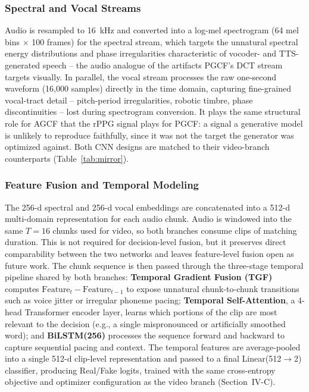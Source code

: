 \documentclass[conference]{IEEEtran}
\begin{document}
\subsubsection{Spectral and Vocal Streams}
Audio is resampled to 16~kHz and converted into a log-mel spectrogram (64 mel bins $\times$ 100 frames) for the spectral stream, which targets the unnatural spectral energy distributions and phase irregularities characteristic of vocoder- and TTS-generated speech -- the audio analogue of the artifacts PGCF's DCT stream targets visually. In parallel, the vocal stream processes the raw one-second waveform (16{,}000 samples) directly in the time domain, capturing fine-grained vocal-tract detail -- pitch-period irregularities, robotic timbre, phase discontinuities -- lost during spectrogram conversion. It plays the same structural role for AGCF that the rPPG signal plays for PGCF: a signal a generative model is unlikely to reproduce faithfully, since it was not the target the generator was optimized against. Both CNN designs are matched to their video-branch counterparts (Table~\ref{tab:mirror}).

\subsubsection{Feature Fusion and Temporal Modeling}
The 256-d spectral and 256-d vocal embeddings are concatenated into a 512-d multi-domain representation for each audio chunk. Audio is windowed into the same $T=16$ chunks used for video, so both branches consume clips of matching duration. This is not required for decision-level fusion, but it preserves direct comparability between the two networks and leaves feature-level fusion open as future work. The chunk sequence is then passed through the three-stage temporal pipeline shared by both branches: \textbf{Temporal Gradient Fusion (TGF)} computes $\text{Feature}_t - \text{Feature}_{t-1}$ to expose unnatural chunk-to-chunk transitions such as voice jitter or irregular phoneme pacing; \textbf{Temporal Self-Attention}, a 4-head Transformer encoder layer, learns which portions of the clip are most relevant to the decision (e.g., a single mispronounced or artificially smoothed word); and \textbf{BiLSTM(256)} processes the sequence forward and backward to capture sequential pacing and context. The temporal features are average-pooled into a single 512-d clip-level representation and passed to a final Linear(512$\to$2) classifier, producing Real/Fake logits, trained with the same cross-entropy objective and optimizer configuration as the video branch (Section~IV-C).
\end{document}
